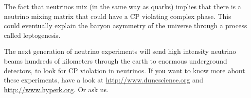 The fact that neutrinos mix (in the same way as quarks) implies that there is a neutrino mixing matrix that could have a CP violating complex phase. This could eventually explain the baryon asymmetry of the universe through a process called leptogenesis.

The next generation of neutrino experiments will send high intensity neutrino beams hundreds of kilometers through the earth to enormous underground detectors, to look for CP violation in neutrinos. If you want to know more about these experiments, have a look at \href{http://www.dunescience.org/}{http://www.dunescience.org} and 
\href{http://www.hyperk.org/}{http://www.hyperk.org}. Or ask us.
